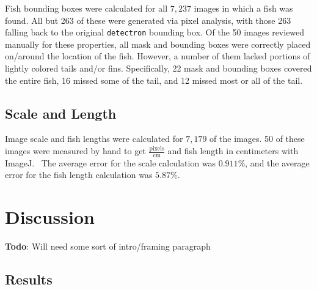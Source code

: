 \documentclass[conference]{IEEEtran}
\begin{document}
Fish bounding boxes were calculated for all \(7,237\) images in which a fish was found. All but 263 of these were generated via pixel analysis, with those 263 falling back to the original \verb|detectron| bounding box. Of the 50 images reviewed manually for these properties, all mask and bounding boxes were correctly placed on/around the location of the fish. However, a number of them lacked portions of lightly colored tails and/or fins. Specifically, 22 mask and bounding boxes covered the entire fish, 16 missed some of the tail, and 12 missed most or all of the tail.

\subsection{Scale and Length}
Image scale and fish lengths were calculated for \(7,179\) of the images. 50 of these images were measured by hand to get \(\frac{\mathrm{pixels}}{\mathrm{cm}}\) and fish length in centimeters with ImageJ.~\cite{imagejCite} The average error for the scale calculation was \(0.911\%\), and the average error for the fish length calculation was \(5.87\%\).

\section{Discussion}
\textbf{Todo}: Will need some sort of intro/framing paragraph
\subsection{Results}
\end{document}

